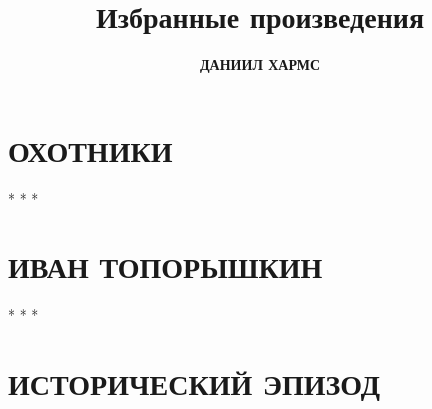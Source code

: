\documentclass[a4paper,12pt]{book}
\author{\LARGE \textbf{ДАНИИЛ ХАРМС}}
\title{Избранные произведения}
\date{}
\begin{document}
\maketitle

\chapter*{\centering ОХОТНИКИ}


\begin{center}
        * * *
    \end{center}

\chapter*{\centering ИВАН ТОПОРЫШКИН}


\begin{center}
        * * *
    \end{center}

\chapter*{\centering ИСТОРИЧЕСКИЙ ЭПИЗОД}

\end{document}
